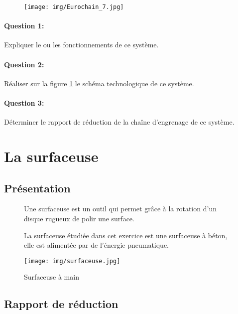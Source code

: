 \newpage

\begin{figure}[!ht]
 \centering\texttt{[image: img/Eurochain\_7.jpg]}
 \label{fig75}
\end{figure}

\paragraph{Question 1:} Expliquer le ou les fonctionnements de ce système.

\paragraph{Question 2:} Réaliser sur la figure \ref{fig75} le schéma technologique de ce système.

\paragraph{Question 3:} Déterminer le rapport de réduction de la chaîne d'engrenage de ce système.

\newpage



\newpage

\section{La surfaceuse}

\subsection{Présentation}
\begin{figure}[!h]
\begin{minipage}{0.6\linewidth}
Une surfaceuse est un outil qui permet grâce à la rotation d'un disque rugueux de polir une surface.

La surfaceuse étudiée dans cet exercice est une surfaceuse à béton, elle est alimentée par de l'énergie pneumatique.
\end{minipage}
 \hfill
\begin{minipage}{0.35\linewidth}
 \centering\texttt{[image: img/surfaceuse.jpg]}
 \caption{Surfaceuse à main}
 \label{fig8}
\end{minipage}
\end{figure}

\subsection{Rapport de réduction}

